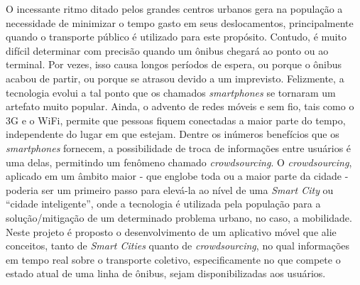 \documentclass{normas-utf-tex_07_2012} %
\title{\MakeUppercase{}} %
\numberwithin{equation}{chapter} %
\begin{document}
\capa %

\folhaderosto %




\begin{resumo}

O incessante ritmo ditado pelos grandes centros urbanos gera na população a necessidade de minimizar o tempo gasto em seus deslocamentos, principalmente quando o transporte público é utilizado para este propósito. Contudo, é muito difícil determinar com precisão quando um ônibus chegará ao ponto ou ao terminal. Por vezes, isso causa longos períodos de espera, ou porque o ônibus acabou de partir, ou porque se atrasou devido a um imprevisto. Felizmente, a tecnologia evolui a tal ponto que os chamados \textit{smartphones} se tornaram um artefato muito popular. Ainda, o advento de redes móveis e sem fio, tais como o 3G e o WiFi, permite que pessoas fiquem conectadas a maior parte do tempo, independente do lugar em que estejam. Dentre os inúmeros benefícios que os \textit{smartphones} fornecem, a possibilidade de troca de informações entre usuários é uma delas, permitindo um fenômeno chamado \textit{crowdsourcing}. O \textit{crowdsourcing}, aplicado em um âmbito maior - que englobe toda ou a maior parte da cidade - poderia ser um primeiro passo para elevá-la ao nível de uma \textit{Smart City} ou ``cidade inteligente'', onde a tecnologia é utilizada pela população para a solução/mitigação de um determinado problema urbano, no caso, a mobilidade. Neste projeto é proposto o desenvolvimento de um aplicativo móvel que alie conceitos, tanto de \textit{Smart Cities} quanto de \textit{crowdsourcing}, no qual informações em tempo real sobre o transporte coletivo, especificamente no que compete o estado atual de uma linha de ônibus, sejam disponibilizadas aos usuários.

\end{resumo}
\end{document}
